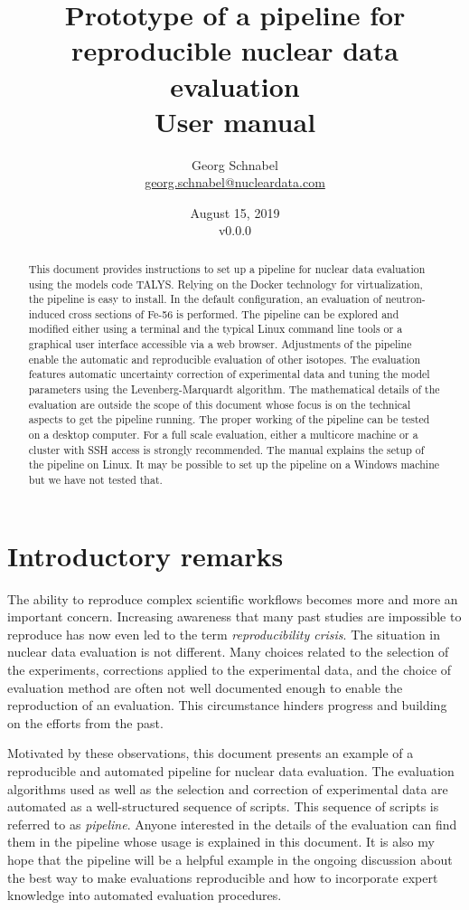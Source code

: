 \documentclass[12pt,a4paper]{scrartcl}
\title{\textbf{Prototype of a pipeline for reproducible nuclear data evaluation} \\[2ex] User manual}
\date{August 15, 2019\\v0.0.0}
\author{Georg Schnabel \\ \href{mailto:georg.schnabel@nucleardata.com}{georg.schnabel@nucleardata.com}}
\begin{document}
 \maketitle
 \begin{abstract}
This document provides instructions to set up a pipeline for nuclear data evaluation using the models code TALYS.
Relying on the Docker technology for virtualization, the pipeline is easy to install.
In the default configuration, an evaluation of neutron-induced cross sections of Fe-56 is performed.
The pipeline can be explored and modified either using a terminal and the typical Linux command line tools or a graphical user interface accessible via a web browser.
Adjustments of the pipeline enable the automatic and reproducible evaluation of other isotopes.
The evaluation features automatic uncertainty correction of experimental data and tuning the model parameters using the Levenberg-Marquardt algorithm.
The mathematical details of the evaluation are outside the scope of this document whose focus is on the technical aspects to get the pipeline running.
The proper working of the pipeline can be tested on a desktop computer.
For a full scale evaluation, either a multicore machine or a cluster with SSH access is strongly recommended.
The manual explains the setup of the pipeline on Linux.
It may be possible to set up the pipeline on a Windows machine but we have not tested that.
 \end{abstract} 
 \newpage
 \tableofcontents
 \newpage 

 \section{Introductory remarks}
 The ability to reproduce complex scientific workflows becomes more and more an important concern.
 Increasing awareness that many past studies are impossible to reproduce has now even led to the term \textit{reproducibility crisis}.
 The situation in nuclear data evaluation is not different.
 Many choices related to the selection of the experiments, corrections applied to the experimental data, and the choice of evaluation method are often not well documented enough to enable the reproduction of an evaluation.
 This circumstance hinders progress and building on the efforts from the past.
 
 Motivated by these observations, this document presents an example of a reproducible and automated pipeline for nuclear data evaluation.
 The evaluation algorithms used as well as the selection and correction of experimental data are automated as a well-structured sequence of scripts.
 This sequence of scripts is referred to as \textit{pipeline}.
 Anyone interested in the details of the evaluation can find them in the pipeline whose usage is explained in this document.
 It is also my hope that the pipeline will be a helpful example in the ongoing discussion about the best way to make evaluations reproducible and how to incorporate expert knowledge into automated evaluation procedures.
 
\end{document}

